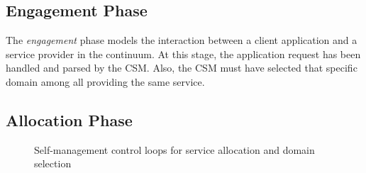 

\subsection*{Engagement Phase}\label{sec:A3-E-engagement}

The \textit{engagement} phase models the interaction between a client application and a service provider in the continuum. At this stage, the application request has been handled and parsed by the CSM. Also, the CSM must have selected that specific domain among all providing the same service. %




\subsection*{Allocation Phase}\label{sec:A3-E-allocation}

\begin{figure}[thbp]
	\centering
	\captionsetup[subfigure]{width=0.4\textwidth}	
	\null\hfill
	\captionsetup[subfigure]{width=0.4\textwidth}	
	\hfill
	\hfill\null
	\caption{Self-management control loops for service allocation and domain selection}\label{fig:allocation-loops}
\end{figure}

